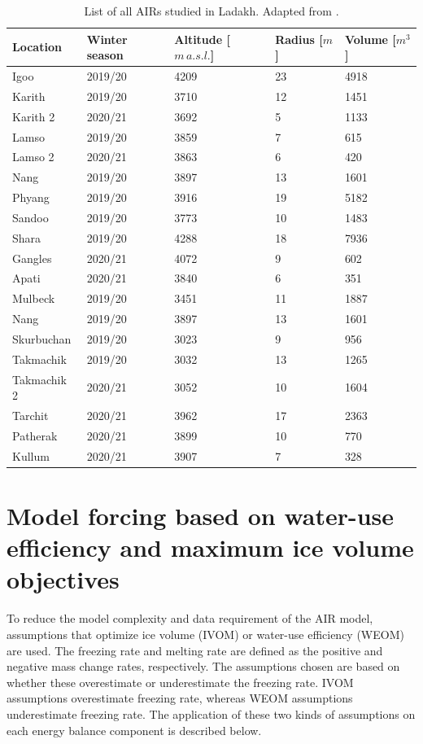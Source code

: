 \begin{table}[htb]
  \centering
  \caption{List of all \ac{AIRs} studied in Ladakh. Adapted from \citet{mariagruberIceStupasLadakh2022}.}
	\label{tab:Ladakh_AIRs}
	\begin{tabular}{|lllll|}
    \hline
    \textbf{Location}     & \textbf{Winter season} & \textbf{Altitude [$m\,a.s.l.$]} & \textbf{
    Radius [$m$]} & \textbf{Volume [$m^3$]} \\ \hline
    Igoo & 2019/20 & 4209 & 23 & 4918  \\
    Karith & 2019/20 & 3710 & 12 & 1451  \\
    Karith 2 & 2020/21 & 3692 & 5 & 1133  \\
    Lamso & 2019/20 & 3859 & 7 & 615  \\
    Lamso 2& 2020/21 & 3863 & 6 & 420  \\
    Nang& 2019/20 & 3897 & 13 & 1601 \\
    Phyang& 2019/20 & 3916 & 19 & 5182 \\
    Sandoo& 2019/20 & 3773 & 10 & 1483 \\
    Shara& 2019/20 & 4288 & 18 & 7936 \\
    Gangles& 2020/21 & 4072 & 9 & 602 \\
    Apati& 2020/21 & 3840 & 6 & 351 \\
    Mulbeck& 2019/20 & 3451 & 11 & 1887\\
    Nang& 2019/20 & 3897 & 13 & 1601\\
    Skurbuchan& 2019/20 & 3023 & 9 & 956\\
    Takmachik& 2019/20 & 3032 & 13 &1265\\
    Takmachik 2& 2020/21 & 3052 & 10 &1604\\
    Tarchit& 2020/21 & 3962 & 17 &2363\\
    Patherak& 2020/21 & 3899 & 10 &770\\
    Kullum& 2020/21 & 3907 & 7 &328\\ \hline
	\end{tabular}
\end{table}

\section{Model forcing based on water-use efficiency and maximum ice volume objectives}
\label{sec:auto_software}

To reduce the model complexity and data requirement of the \ac{AIR} model, assumptions that optimize ice volume (IVOM) or
water-use efficiency (WEOM) are used. The freezing rate and melting rate are defined as the positive and
negative mass change rates, respectively. The assumptions chosen are based on whether these overestimate or
underestimate the freezing rate. IVOM assumptions overestimate freezing rate, whereas WEOM assumptions
underestimate freezing rate. The application of these two kinds of assumptions on each energy balance component
is described below. 

